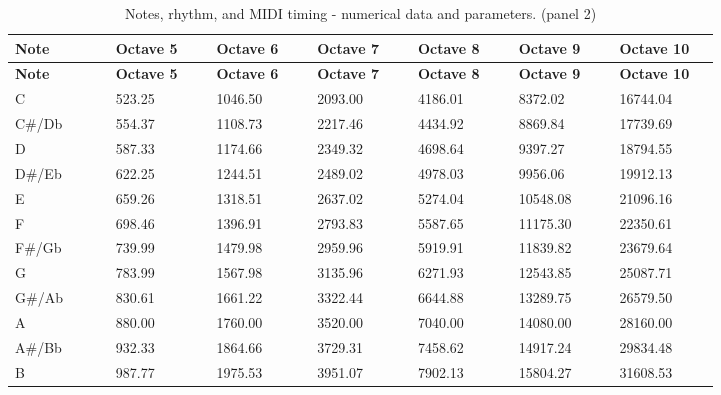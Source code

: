\documentclass[11pt,a4paper]{article}
\begin{document}
\begingroup\small\setlength{\tabcolsep}{3pt}\renewcommand{\arraystretch}{1.18}\begin{longtable}{@{}p{0.1171\linewidth}p{0.1171\linewidth}p{0.1171\linewidth}p{0.1171\linewidth}p{0.1171\linewidth}p{0.1171\linewidth}p{0.1171\linewidth}@{}}
\caption{Notes, rhythm, and MIDI timing - numerical data and parameters. (panel 2)}\label{tab:010_p004_table11}\\\toprule
\textbf{Note} & \textbf{Octave 5} & \textbf{Octave 6} & \textbf{Octave 7} & \textbf{Octave 8} & \textbf{Octave 9} & \textbf{Octave 10} \\ \midrule\endfirsthead \textbf{Note} & \textbf{Octave 5} & \textbf{Octave 6} & \textbf{Octave 7} & \textbf{Octave 8} & \textbf{Octave 9} & \textbf{Octave 10} \\ \midrule\endhead
C & 523.25 & 1046.50 & 2093.00 & 4186.01 & 8372.02 & 16744.04 \\
C\#/\allowbreak{}Db & 554.37 & 1108.73 & 2217.46 & 4434.92 & 8869.84 & 17739.69 \\
D & 587.33 & 1174.66 & 2349.32 & 4698.64 & 9397.27 & 18794.55 \\
D\#/\allowbreak{}Eb & 622.25 & 1244.51 & 2489.02 & 4978.03 & 9956.06 & 19912.13 \\
E & 659.26 & 1318.51 & 2637.02 & 5274.04 & 10548.08 & 21096.16 \\
F & 698.46 & 1396.91 & 2793.83 & 5587.65 & 11175.30 & 22350.61 \\
F\#/\allowbreak{}Gb & 739.99 & 1479.98 & 2959.96 & 5919.91 & 11839.82 & 23679.64 \\
G & 783.99 & 1567.98 & 3135.96 & 6271.93 & 12543.85 & 25087.71 \\
G\#/\allowbreak{}Ab & 830.61 & 1661.22 & 3322.44 & 6644.88 & 13289.75 & 26579.50 \\
A & 880.00 & 1760.00 & 3520.00 & 7040.00 & 14080.00 & 28160.00 \\
A\#/\allowbreak{}Bb & 932.33 & 1864.66 & 3729.31 & 7458.62 & 14917.24 & 29834.48 \\
B & 987.77 & 1975.53 & 3951.07 & 7902.13 & 15804.27 & 31608.53 \\
\bottomrule\end{longtable}\endgroup
\end{document}
